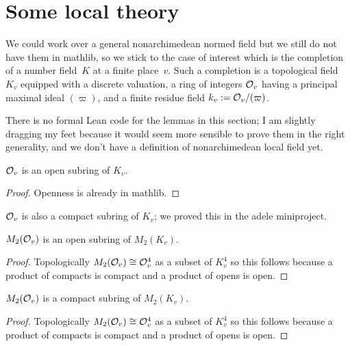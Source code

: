 \section{Some local theory}

We could work over a general nonarchimedean normed field but we still do not have them
in mathlib, so we stick to the case of interest which is the completion of a number
field~$K$ at a finite place~$v$. Such a completion is a topological field~$K_v$
equipped with a discrete valuation, a ring of integers $\mathcal{O}_v$ having a principal
maximal ideal $(\varpi)$, and a finite residue field $k_v:=\mathcal{O}_v/(\varpi)$.

There is no formal Lean code for the lemmas in this section; I am slightly dragging my
feet because it would seem more sensible to prove them in the right generality,
and we don't have a definition of nonarchimedean local field yet.

\begin{lemma}
  \label{NumberField.isOpenAdicCompletionIntegers}
  \leanok
  $\mathcal{O}_v$ is an open subring of $K_v$.
\end{lemma}
\begin{proof}
  \leanok
  Openness is already in mathlib.
\end{proof}

$\mathcal{O}_v$ is also a compact subring of $K_v$; we proved this in the adele
miniproject.

\begin{lemma} $M_2(\mathcal{O}_v)$ is an open subring of $M_2(K_v)$.
  \label{M2.localFullLevel.isOpen}
  \leanok
\end{lemma}
\begin{proof}
  \leanok
  Topologically $M_2(\mathcal{O}_v)\cong \mathcal{O}_v^4$ as a subset of $K_v^4$ so this
  follows because a product of compacts is compact and a product of opens is open.
\end{proof}

\begin{lemma} $M_2(\mathcal{O}_v)$ is a compact subring of $M_2(K_v)$.
  \label{M2.localFullLevel.isCompact}
  \leanok
\end{lemma}
\begin{proof}
  \leanok
  Topologically $M_2(\mathcal{O}_v)\cong \mathcal{O}_v^4$ as a subset of $K_v^4$ so this
  follows because a product of compacts is compact and a product of opens is open.
\end{proof}

